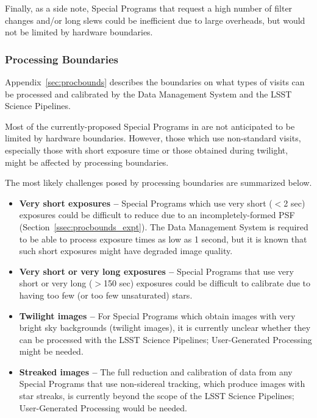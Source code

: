 Finally, as a side note, Special Programs that request a high number of 
filter changes and/or long slews could be inefficient due to large overheads,
but would not be limited by hardware boundaries.

\subsubsection{Processing Boundaries}\label{ssec:proc_bounds_processing}

Appendix~\ref{sec:procbounds} describes the boundaries on what types of visits 
can be processed and calibrated by the Data Management System and the LSST
Science Pipelines.

Most of the currently-proposed Special Programs in 
are not anticipated to be limited by hardware boundaries.
However, those which use non-standard visits, especially those with
short exposure time or those obtained during twilight, might
be affected by processing boundaries.

The most likely challenges posed by processing
boundaries are summarized below.

\begin{itemize}

\item \textbf{Very short exposures --}
Special Programs which use very short ($<$2 sec) exposures 
could be difficult to reduce due to an incompletely-formed PSF 
(Section~\ref{ssec:procbounds_expt}).
The Data Management System is required to be able to process exposure 
times as low as 1 second, but it is known that such short exposures might 
have degraded image quality.

\item \textbf{Very short or very long exposures --}
Special Programs that use very short or very long ($>$150 sec) 
exposures could be difficult to calibrate due to having too few 
(or too few unsaturated) stars.

\item \textbf{Twilight images --}
For Special Programs which obtain images with very bright sky backgrounds
(twilight images), it is currently unclear whether they can be processed
with the LSST Science Pipelines; User-Generated Processing might be needed.

\item \textbf{Streaked images --}
The full reduction and calibration of data from any Special Programs that 
use non-sidereal tracking, which produce images with star streaks, is
currently beyond the scope of the LSST Science Pipelines; 
User-Generated Processing would be needed.

\end{itemize}

